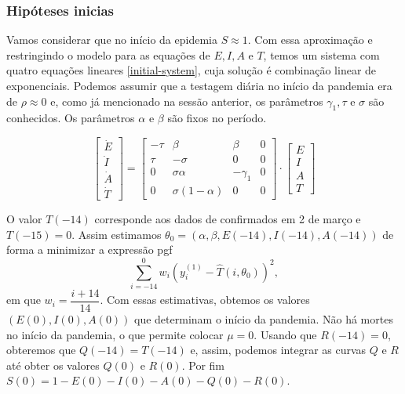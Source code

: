 \subsubsection{Hipóteses inicias}
\label{initial-hypotheses}

Vamos considerar que no início da epidemia $S \approx 1$. Com essa aproximação e restringindo o modelo para as equações de $E, I, A$ e $T$, temos um sistema com quatro equações lineares \eqref{initial-system}, cuja solução é combinação linear de exponenciais.  
Podemos assumir que a testagem diária no início da pandemia era de $\rho \approx 0$ e, como já mencionado na sessão anterior, os parâmetros $\gamma_1, \tau$ e $\sigma$ são conhecidos. Os parâmetros $\alpha$ e $\beta$ são fixos no período. 

\begin{equation}
    \begin{bmatrix}
        \dot{E} \\ \dot{I} \\ \dot{A} \\ \dot{T} 
    \end{bmatrix} = 
    \begin{bmatrix}
        - \tau & \beta & \beta & 0 \\
        \tau & -\sigma & 0 & 0 \\
        0 & \sigma \alpha & -\gamma_1 & 0 \\
        0 & \sigma (1 - \alpha) & 0 & 0  
    \end{bmatrix}\cdot
    \begin{bmatrix}
        E \\ I \\ A \\ T 
    \end{bmatrix} 
    \label{initial-system}
\end{equation}

O valor $T(-14)$ corresponde aos dados de confirmados em 2 de março e $T(-15) = 0$.  
Assim estimamos $\theta_0 = (\alpha, \beta, E(-14), I(-14), A(-14))$ de forma a minimizar a expressão pgf
\begin{equation}
    \sum_{i=-14}^{0} w_i\left(y_i^{(1)} - \hat{T}(i, \theta_0)\right)^2,
\end{equation}
em que $w_i = \dfrac{i+14}{14}$. Com essas estimativas, obtemos os valores $(E(0), I(0), A(0))$ que determinam o início da pandemia. 
Não há mortes no início da pandemia, o que permite colocar $\mu = 0$. 
Usando que $R(-14) = 0$, obteremos que $Q(-14) = T(-14)$ e, assim, podemos integrar as curvas $Q$ e $R$ até obter os valores $Q(0)$ e $R(0)$. 
Por fim $S(0) = 1 - E(0) - I(0) - A(0) - Q(0) - R(0)$.

